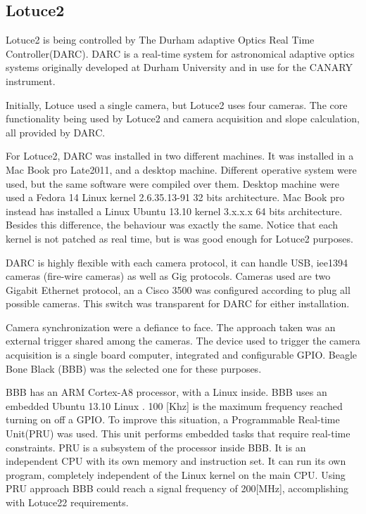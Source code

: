 \documentclass[]{spie}  %
\begin{document}
\subsection{Lotuce2}
Lotuce2 is being controlled by The Durham adaptive Optics Real Time
Controller(DARC). DARC is a real-time system for astronomical adaptive optics
systems originally developed at Durham University and in use for the CANARY
instrument.

Initially, Lotuce used a single camera, but Lotuce2 uses four
cameras. The core functionality being used by Lotuce2 and camera acquisition
and slope calculation, all provided by DARC.  

For Lotuce2, DARC was installed
in two different machines. It was installed in a Mac Book pro Late2011, and a
desktop machine.  Different operative system were used, but the same software
were compiled over them. Desktop machine were used a Fedora 14 Linux kernel
2.6.35.13-91 32 bits architecture. Mac Book pro instead has installed a Linux
Ubuntu 13.10 kernel 3.x.x.x 64 bits architecture.  Besides this difference, the
behaviour was exactly the same. Notice that each kernel is not patched as real
time, but is was good enough for Lotuce2 purposes.

DARC is highly flexible with each camera protocol, it can handle USB,
iee1394 cameras (fire-wire cameras) as well as Gig protocols. Cameras used
are two Gigabit Ethernet protocol, an a Cisco 3500 was configured according
to plug all possible cameras. This switch was transparent for DARC for
either installation.  

Camera synchronization were a defiance to face. The approach taken was an
external trigger shared among the cameras. The device used to trigger the
camera acquisition is a single board computer, integrated and configurable GPIO.
Beagle Bone Black (BBB) was the selected one for these purposes. 

BBB has an ARM Cortex-A8 processor, with a Linux inside. BBB uses an embedded
Ubuntu 13.10 Linux . 100 [Khz] is the  maximum frequency reached turning on off
a GPIO. To improve this situation, a Programmable Real-time Unit(PRU) was used.
This unit performs embedded tasks that require real-time constraints. PRU is a
subsystem of the processor inside BBB. It is an independent CPU with its own
memory and instruction set. It can run its own program, completely independent
of the Linux kernel on the main CPU. Using PRU approach BBB could reach a signal
frequency of 200[MHz], accomplishing  with Lotuce22 requirements.  
\end{document}

